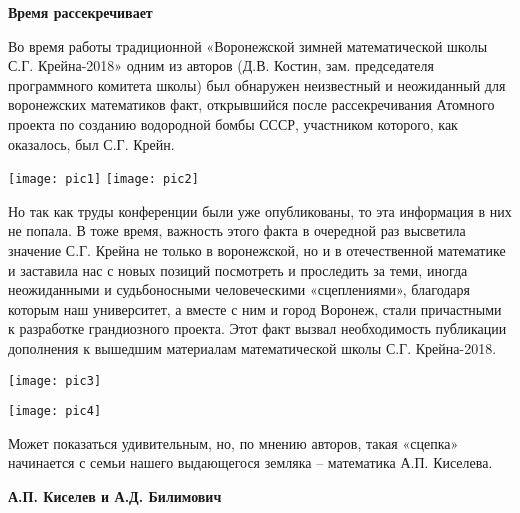 
\vzmscaption

\begin{center}
{\bf Время рассекречивает}
\end{center}

Во время работы традиционной «Воронежской зимней математической школы С.Г. Крейна-2018» одним из авторов (Д.В. Костин, зам. председателя программного комитета школы) был обнаружен неизвестный и неожиданный для воронежских математиков факт, открывшийся после рассекречивания Атомного проекта по созданию водородной бомбы СССР, участником которого, как оказалось, был С.Г. Крейн.

\texttt{[image: pic1]}
\texttt{[image: pic2]}

Но так как труды конференции были уже опубликованы, то эта информация в них не попала. В тоже время, важность этого факта в очередной раз высветила значение С.Г. Крейна не только в воронежской, но и в отечественной математике и заставила нас с новых позиций посмотреть и проследить за теми, иногда неожиданными и судьбоносными человеческими «сцеплениями», благодаря которым наш университет, а вместе с ним и город Воронеж, стали причастными к разработке грандиозного проекта. Этот факт вызвал необходимость публикации дополнения к вышедшим материалам математической школы С.Г. Крейна-2018.

\texttt{[image: pic3]}

\texttt{[image: pic4]}

Может показаться удивительным, но, по мнению авторов, такая «сцепка» начинается с семьи нашего выдающегося земляка – математика А.П. Киселева.

\begin{center}
{\bf А.П. Киселев и А.Д. Билимович}
\end{center}

